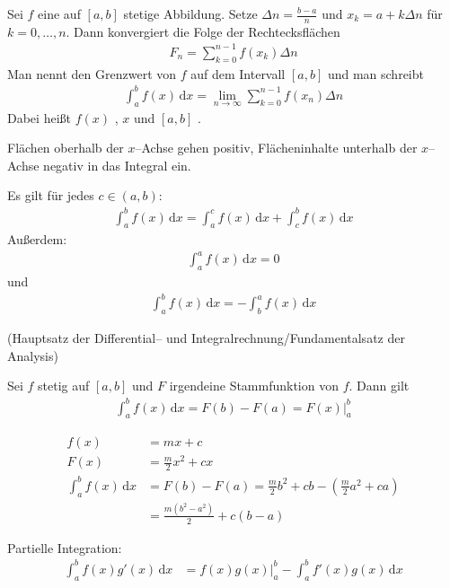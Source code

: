 Sei $f$ eine auf $[a, b]$ stetige Abbildung. Setze $\Delta n = \frac{b-a}{n}$ und $x_k = a + k \Delta n$ für $k = 0,\dots,n$. Dann konvergiert die Folge der Rechtecksflächen
\begin{align*}
	F_n = \sum_{k=0}^{n-1} f(x_k)\Delta n
\end{align*}
Man nennt den Grenzwert  von $f$ auf dem Intervall $[a, b]$ und man schreibt
\begin{align*}
	\int_a^b \! f(x) \, \mathrm{d}x = \lim\limits_{n \to \infty} \sum_{k=0}^{n-1} f(x_n) \Delta n
\end{align*}
Dabei heißt $f(x)$ , $x$  und $[a, b]$ .

\bigskip
Flächen oberhalb der $x$--Achse gehen positiv, Flächeninhalte unterhalb der $x$--Achse negativ in das Integral ein.

\medskip
Es gilt für jedes $c \in (a, b)$:
\begin{align*}
	\int_a^b \! f(x) \, \mathrm{d}x = \int_a^c \! f(x) \, \mathrm{d}x + \int_c^b \! f(x) \, \mathrm{d}x
\end{align*}
Außerdem:
\begin{align*}
	\int_a^a \! f(x) \, \mathrm{d}x = 0
\end{align*}
und
\begin{align*}
	\int_a^b \! f(x) \, \mathrm{d}x = -\int_b^a \! f(x) \, \mathrm{d}x
\end{align*}

 (Hauptsatz der Differential-- und Integralrechnung/Fundamentalsatz der Analysis)

Sei $f$ stetig auf $[a, b]$ und $F$ irgendeine Stammfunktion von $f$. Dann gilt
\begin{align*}
	\int_a^b \! f(x) \, \mathrm{d}x = F(b) - F(a) = F(x)\bigg\vert_a^b
\end{align*}

\begin{align*}
	f(x) &= mx+c \\
	F(x) &= \frac{m}{2}x^2 + cx \\
	\int_a^b \! f(x) \, \mathrm{d}x &= F(b) - F(a) = \frac{m}{2}b^2 + cb - \left(\frac{m}{2}a^2 + ca\right) \\
	&= \frac{m(b^2-a^2)}{2} + c(b-a)
\end{align*}


Partielle Integration:
\begin{align*}
	\int_a^b \! f(x)g'(x) \, \mathrm{d}x &= f(x)g(x)\bigg\vert_a^b - \int_a^b \! f'(x)g(x) \, \mathrm{d}x \\
\end{align*}

